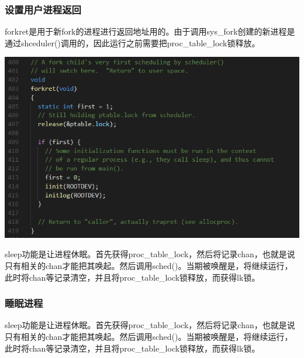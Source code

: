 \subsubsection{设置用户进程返回}

forkret是用于新fork的进程进行返回地址用的。由于调用sys\_fork创建的新进程是通过shceduler()调用的，因此运行之前需要把proc\_table\_lock锁释放。

\includegraphics[width=6in]{figures/process/fig11.png}

sleep功能是让进程休眠。首先获得proc\_table\_lock，然后将记录chan，也就是说只有相关的chan才能把其唤起。然后调用sched()。当期被唤醒是，将继续运行，此时将chan等记录清空，并且将proc\_table\_lock锁释放，而获得lk锁。

\subsubsection{睡眠进程}

sleep功能是让进程休眠。首先获得proc\_table\_lock，然后将记录chan，也就是说只有相关的chan才能把其唤起。然后调用sched()。当期被唤醒是，将继续运行，此时将chan等记录清空，并且将proc\_table\_lock锁释放，而获得lk锁。

